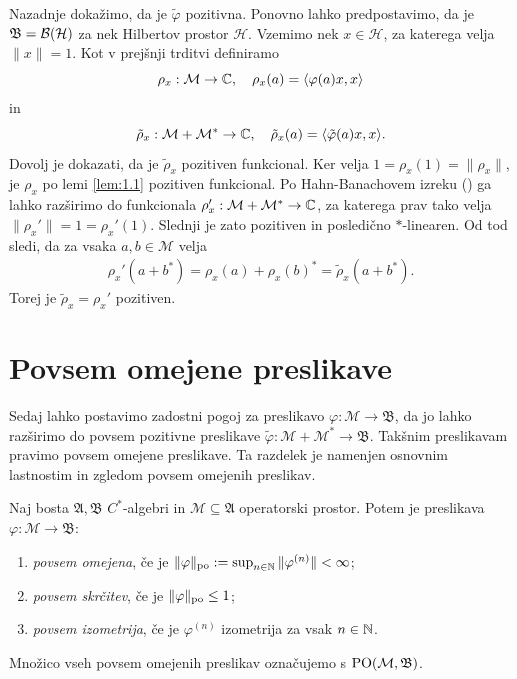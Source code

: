 \begin{dokaz}
    Nazadnje dokažimo, da je $\tilde{\varphi}$ pozitivna.
    Ponovno lahko predpostavimo, da je $\mathfrak{B} = \operatorname{\mathcal{B} (\mathcal{H})}$ za nek Hilbertov prostor $\mathcal{H}$.
    Vzemimo nek $x \in \mathcal{H}$, za katerega velja $\| x\| = 1$. 
    Kot v prejšnji trditvi definiramo $$\rho_x : \mathcal{M} \to \mathbb C,\quad \rho_x (a) = \langle {\varphi} (a) x, x\rangle$$
    in 
    $$\tilde{\rho}_x : \mathcal{M} + \mathcal{M}^* \to \mathbb C,\quad \tilde{\rho}_x (a) = \langle \tilde{\varphi} (a) x, x\rangle.$$
    Dovolj je dokazati, da je $\tilde{\rho}_x$ pozitiven funkcional.
    Ker velja $ 1 = \rho_x (1) = \| \rho_x\|$, je $\rho_x$ po lemi \ref{lem:1.1} pozitiven funkcional. 
    Po Hahn-Banachovem izreku (\cite[Corollary III.6.5., str. 79]{conway1990}) ga lahko
    razširimo do funkcionala $\rho_x ': \mathcal{M} + \mathcal{M}^* \to \mathbb C$,
    za katerega prav tako velja $\| \rho_x '\| = 1 = \rho_x '(1)$.
    Slednji je zato pozitiven in posledično $*$-linearen.
    Od tod sledi, da za vsaka $a, b \in \mathcal{M}$ velja
    \begin{align*}
        \rho_x ' (a + b^*) = \rho_x (a) + \rho_x (b)^* = \tilde{\rho}_x (a + b^*).
    \end{align*}
    Torej je $\tilde{\rho}_x = \rho_x '$ pozitiven.
\end{dokaz}


\section{Povsem omejene preslikave}\label{sec:4}

Sedaj lahko postavimo zadostni pogoj za preslikavo $\varphi: \mathcal{M} \to \mathfrak{B}$,
da jo lahko razširimo do povsem pozitivne preslikave $\tilde{\varphi}: \mathcal{M} + \mathcal{M}^* \to \mathfrak{B}$.
Takšnim preslikavam pravimo povsem omejene preslikave. Ta razdelek je namenjen osnovnim lastnostim in zgledom povsem omejenih preslikav.

\begin{definicija}
    Naj bosta $\mathfrak{A}, \mathfrak{B}$ $C^*$-algebri in $\mathcal{M} \subseteq \mathfrak{A}$ operatorski prostor.
    Potem je preslikava $\varphi: \mathcal{M} \to \mathfrak{B}$:
    \begin{enumerate}
        \item \emph{povsem omejena}, če je $\| \varphi\|_{\operatorname{po}} := \sup_{n \in \mathbb N} \| \varphi^{(n)}\| < \infty$;
        \item \emph{povsem skrčitev}, če je $\| \varphi\|_{\operatorname{po}} \leq 1$;
        \item \emph{povsem izometrija}, če je $\varphi^{(n)}$ izometrija za vsak $n \in \mathbb N$. 
    \end{enumerate}
    Množico vseh povsem omejenih preslikav označujemo s $\operatorname{PO} (\mathcal{M}, \mathfrak{B})$.
\end{definicija}

